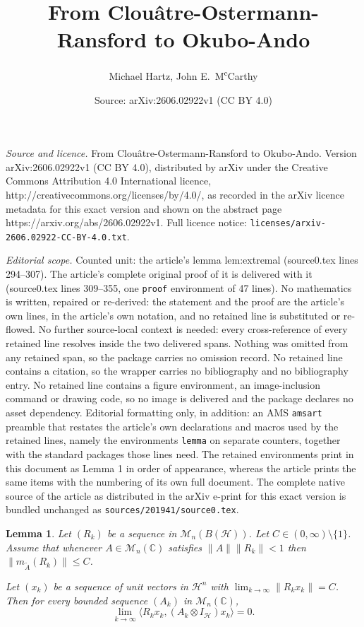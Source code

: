\documentclass[10pt,a4paper]{amsart}
\title{From Clou\^atre-Ostermann-Ransford to Okubo-Ando}
\author{Michael Hartz, John E.\ M\textsuperscript{c}Carthy}
\date{Source: arXiv:2606.02922v1 (CC BY 4.0)}
\newtheorem{lemma}{Lemma}
\newcommand\matn{{\mathcal M}_n}
\newcommand\ta{{\tilde{A}}}
\begin{document}
\maketitle

\noindent\emph{Source and licence.} From Clou\^atre-Ostermann-Ransford to Okubo-Ando. Version arXiv:2606.02922v1 (CC BY 4.0), distributed by arXiv under the Creative Commons Attribution 4.0 International licence, http://creativecommons.org/licenses/by/4.0/, as recorded in the arXiv licence metadata for this exact version and shown on the abstract page https://arxiv.org/abs/2606.02922v1. Full licence notice: \texttt{licenses/arxiv-2606.02922-CC-BY-4.0.txt}.\par\smallskip

\noindent\textit{Editorial scope.} Counted unit: the article's lemma lem:extremal (source0.tex lines 294--307). The article's complete original proof of it is delivered with it (source0.tex lines 309--355, one \texttt{proof} environment of 47 lines). No mathematics is written, repaired or re-derived: the statement and the proof are the article's own lines, in the article's own notation, and no retained line is substituted or re-flowed.  No further source-local context is needed: every cross-reference of every retained line resolves inside the two delivered spans.  Nothing was omitted from any retained span, so the package carries no omission record.  No retained line contains a citation, so the wrapper carries no bibliography and no bibliography entry.  No retained line contains a figure environment, an image-inclusion command or drawing code, so no image is delivered and the package declares no asset dependency.  Editorial formatting only, in addition: an AMS \texttt{amsart} preamble that restates the article's own declarations and macros used by the retained lines, namely the environments \texttt{lemma} on separate counters, together with the standard packages those lines need.  The retained environments print in this document as Lemma 1 in order of appearance, whereas the article prints the same items with the numbering of its own full document.  The complete native source of the article as distributed in the arXiv e-print for this exact version is bundled unchanged as \texttt{sources/201941/source0.tex}.
\begin{lemma}
  \label{lem:extremal}
  Let $(R_k)$ be a sequence in $\matn(B(\mathcal{H}))$. Let $C \in (0,\infty) \setminus \{1\}$.
  Assume that whenever $A \in \matn(\mathbb{C})$ satisfies $\|A\| \|R_k\| < 1$ then $ \|m_\ta(R_k)\| \le C$.

  Let $(x_k)$ be a sequence of unit vectors in $\mathcal{H}^n$ with $\lim_{k \to \infty} \|R_k x_k\| = C$.
  Then for every bounded sequence $(A_k)$ in $\matn(\mathbb{C})$,
  \begin{equation*}
    \lim_{k \to \infty} \langle R_k x_k, (A_k \otimes I_{\mathcal{H}}) x_k \rangle  =0.
  \end{equation*}
\end{lemma}
\end{document}
